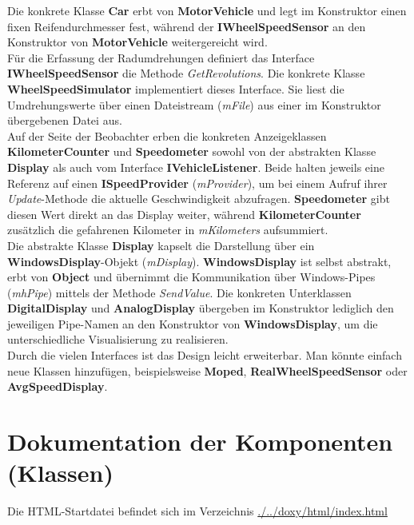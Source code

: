 Die konkrete Klasse \textbf{Car} erbt von \textbf{MotorVehicle} und legt im Konstruktor einen fixen Reifendurchmesser fest, während der \textbf{IWheelSpeedSensor} an den Konstruktor von \textbf{MotorVehicle} weitergereicht wird.\\

Für die Erfassung der Radumdrehungen definiert das Interface \textbf{IWheelSpeedSensor} die Methode \textit{GetRevolutions}. Die konkrete Klasse \textbf{WheelSpeedSimulator} implementiert dieses Interface. Sie liest die Umdrehungswerte über einen Dateistream (\textit{mFile}) aus einer im Konstruktor übergebenen Datei aus.\\

Auf der Seite der Beobachter erben die konkreten Anzeigeklassen \textbf{KilometerCounter} und \textbf{Speedometer} sowohl von der abstrakten Klasse \textbf{Display} als auch vom Interface \textbf{IVehicleListener}. Beide halten jeweils eine Referenz auf einen \textbf{ISpeedProvider} (\textit{mProvider}), um bei einem Aufruf ihrer \textit{Update}-Methode die aktuelle Geschwindigkeit abzufragen. \textbf{Speedometer} gibt diesen Wert direkt an das Display weiter, während \textbf{KilometerCounter} zusätzlich die gefahrenen Kilometer in \textit{mKilometers} aufsummiert.\\

Die abstrakte Klasse \textbf{Display} kapselt die Darstellung über ein \textbf{WindowsDisplay}-Objekt (\textit{mDisplay}). \textbf{WindowsDisplay} ist selbst abstrakt, erbt von \textbf{Object} und übernimmt die Kommunikation über Windows-Pipes (\textit{mhPipe}) mittels der Methode \textit{SendValue}. Die konkreten Unterklassen \textbf{DigitalDisplay} und \textbf{AnalogDisplay} übergeben im Konstruktor lediglich den jeweiligen Pipe-Namen an den Konstruktor von \textbf{WindowsDisplay}, um die unterschiedliche Visualisierung zu realisieren.\\

Durch die vielen Interfaces ist das Design leicht erweiterbar. Man könnte einfach neue Klassen hinzufügen, beispielsweise \textbf{Moped}, \textbf{RealWheelSpeedSensor} oder \textbf{AvgSpeedDisplay}.\\

\section{Dokumentation der Komponenten (Klassen)}

Die HTML-Startdatei befindet sich im Verzeichnis \href{run:./../doxy/html/index.html}{./../doxy/html/index.html}

